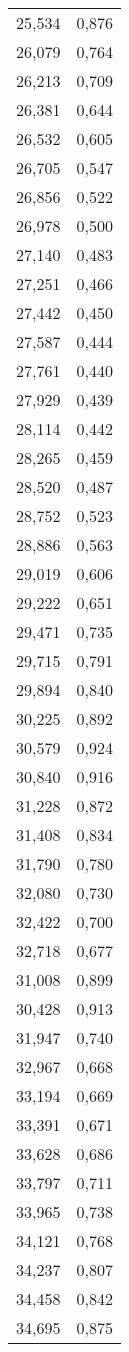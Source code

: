 \begin{longtable}{c c}
	25,534&0,876 \\
	26,079&0,764 \\
	26,213&0,709 \\
	26,381&0,644 \\
	26,532&0,605 \\
	26,705&0,547 \\
	26,856&0,522 \\
	26,978&0,500 \\
	27,140&0,483 \\
	27,251&0,466 \\
	27,442&0,450 \\
	27,587&0,444 \\
	27,761&0,440 \\
	27,929&0,439 \\
	28,114&0,442 \\
	28,265&0,459 \\
	28,520&0,487 \\
	28,752&0,523 \\
	28,886&0,563 \\
	29,019&0,606 \\
	29,222&0,651 \\
	29,471&0,735 \\
	29,715&0,791 \\
	29,894&0,840 \\
	30,225&0,892 \\
	30,579&0,924 \\
	30,840&0,916 \\
	31,228&0,872 \\
	31,408&0,834 \\
	31,790&0,780 \\
	32,080&0,730 \\
	32,422&0,700 \\
	32,718&0,677 \\
	31,008&0,899 \\
	30,428&0,913 \\
	31,947&0,740 \\
	32,967&0,668 \\
	33,194&0,669 \\
	33,391&0,671 \\
	33,628&0,686 \\
	33,797&0,711 \\
	33,965&0,738 \\
	34,121&0,768 \\
	34,237&0,807 \\
	34,458&0,842 \\
	34,695&0,875 \\

\end{longtable}
